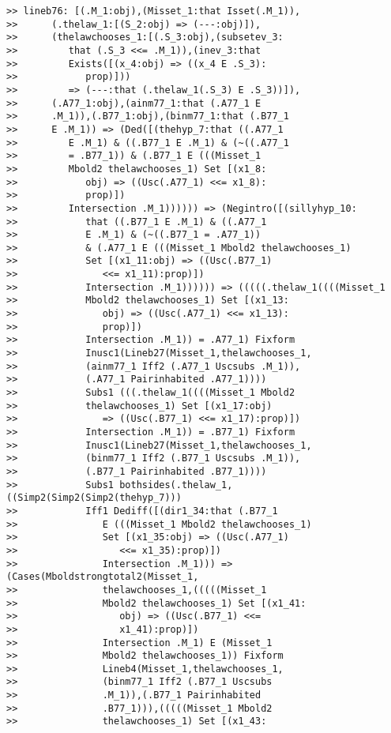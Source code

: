 \documentclass[12pt]{article}
\begin{document}
\begin{verbatim}
>> lineb76: [(.M_1:obj),(Misset_1:that Isset(.M_1)),
>>      (.thelaw_1:[(S_2:obj) => (---:obj)]),
>>      (thelawchooses_1:[(.S_3:obj),(subsetev_3:
>>         that (.S_3 <<= .M_1)),(inev_3:that
>>         Exists([(x_4:obj) => ((x_4 E .S_3):
>>            prop)]))
>>         => (---:that (.thelaw_1(.S_3) E .S_3))]),
>>      (.A77_1:obj),(ainm77_1:that (.A77_1 E
>>      .M_1)),(.B77_1:obj),(binm77_1:that (.B77_1
>>      E .M_1)) => (Ded([(thehyp_7:that ((.A77_1
>>         E .M_1) & ((.B77_1 E .M_1) & (~((.A77_1
>>         = .B77_1)) & (.B77_1 E (((Misset_1
>>         Mbold2 thelawchooses_1) Set [(x1_8:
>>            obj) => ((Usc(.A77_1) <<= x1_8):
>>            prop)])
>>         Intersection .M_1)))))) => (Negintro([(sillyhyp_10:
>>            that ((.B77_1 E .M_1) & ((.A77_1
>>            E .M_1) & (~((.B77_1 = .A77_1))
>>            & (.A77_1 E (((Misset_1 Mbold2 thelawchooses_1)
>>            Set [(x1_11:obj) => ((Usc(.B77_1)
>>               <<= x1_11):prop)])
>>            Intersection .M_1)))))) => (((((.thelaw_1((((Misset_1
>>            Mbold2 thelawchooses_1) Set [(x1_13:
>>               obj) => ((Usc(.A77_1) <<= x1_13):
>>               prop)])
>>            Intersection .M_1)) = .A77_1) Fixform
>>            Inusc1(Lineb27(Misset_1,thelawchooses_1,
>>            (ainm77_1 Iff2 (.A77_1 Uscsubs .M_1)),
>>            (.A77_1 Pairinhabited .A77_1))))
>>            Subs1 (((.thelaw_1((((Misset_1 Mbold2
>>            thelawchooses_1) Set [(x1_17:obj)
>>               => ((Usc(.B77_1) <<= x1_17):prop)])
>>            Intersection .M_1)) = .B77_1) Fixform
>>            Inusc1(Lineb27(Misset_1,thelawchooses_1,
>>            (binm77_1 Iff2 (.B77_1 Uscsubs .M_1)),
>>            (.B77_1 Pairinhabited .B77_1))))
>>            Subs1 bothsides(.thelaw_1,((Simp2(Simp2(Simp2(thehyp_7)))
>>            Iff1 Dediff([(dir1_34:that (.B77_1
>>               E (((Misset_1 Mbold2 thelawchooses_1)
>>               Set [(x1_35:obj) => ((Usc(.A77_1)
>>                  <<= x1_35):prop)])
>>               Intersection .M_1))) => (Cases(Mboldstrongtotal2(Misset_1,
>>               thelawchooses_1,(((((Misset_1
>>               Mbold2 thelawchooses_1) Set [(x1_41:
>>                  obj) => ((Usc(.B77_1) <<=
>>                  x1_41):prop)])
>>               Intersection .M_1) E (Misset_1
>>               Mbold2 thelawchooses_1)) Fixform
>>               Lineb4(Misset_1,thelawchooses_1,
>>               (binm77_1 Iff2 (.B77_1 Uscsubs
>>               .M_1)),(.B77_1 Pairinhabited
>>               .B77_1))),(((((Misset_1 Mbold2
>>               thelawchooses_1) Set [(x1_43:

\end{verbatim}
\end{document}
